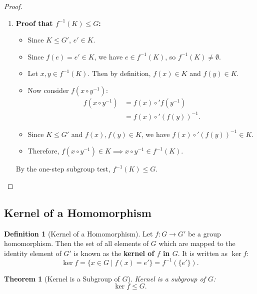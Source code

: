 \documentclass[12pt]{article}
\theoremstyle{definition}
\newtheorem{definition}{Definition}[section]
\theoremstyle{plain}
\newtheorem{theorem}{Theorem}[section]
\begin{document}
\begin{proof}
\begin{enumerate}
    \item \textbf{Proof that $f^{-1}(K) \le G$:}
    \begin{itemize}
        \item Since $K \le G'$, $e' \in K$.
        \item Since $f(e) = e' \in K$, we have $e \in f^{-1}(K)$, so $f^{-1}(K) \neq \emptyset$.
        \item Let $x, y \in f^{-1}(K)$. Then by definition, $f(x) \in K$ and $f(y) \in K$.
        \item Now consider $f(x \circ y^{-1})$:
        \begin{align*}
            f(x \circ y^{-1}) &= f(x) \circ' f(y^{-1}) \\
            &= f(x) \circ' (f(y))^{-1}.
        \end{align*}
        \item Since $K \le G'$ and $f(x), f(y) \in K$, we have $f(x) \circ' (f(y))^{-1} \in K$.
        \item Therefore, $f(x \circ y^{-1}) \in K \implies x \circ y^{-1} \in f^{-1}(K)$.
    \end{itemize}
    By the one-step subgroup test, $\boxed{f^{-1}(K) \le G}$.
\end{enumerate}
\end{proof}

\subsection{Kernel of a Homomorphism}

\begin{definition}[Kernel of a Homomorphism]
Let $f: G \longrightarrow G'$ be a group homomorphism. Then the set of all elements of $G$ which are mapped to the identity element of $G'$ is known as the \textbf{kernel of $f$ in $G$}. It is written as $\ker f$:
\[
\ker f = \{ x \in G \mid f(x) = e' \} = f^{-1}(\{e'\}).
\]
\end{definition}

\begin{theorem}[Kernel is a Subgroup of $G$]
Kernel is a subgroup of $G$:
\[
\ker f \le G.
\]
\end{theorem}
\end{document}
